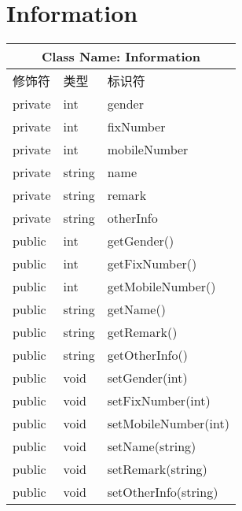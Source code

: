 \section{Information}
	\begin{tabular}{|l|l|l|}
	    \hline
	    \multicolumn{3}{|c|}{Class Name: Information} \\
	    \hline
	    修饰符 & 类型 & 标识符 \\
	    \hline
	    private & int & gender \\
	    private & int & fixNumber \\
	    private & int & mobileNumber \\
	    private & string & name \\
	    private & string & remark \\
	    private & string & otherInfo \\
	    \hline
	    public & int & getGender() \\
	    public & int & getFixNumber() \\
	    public & int & getMobileNumber() \\
	    public & string & getName() \\
	    public & string & getRemark() \\
	    public & string & getOtherInfo() \\
	    public & void & setGender(int) \\
	    public & void & setFixNumber(int) \\
	    public & void & setMobileNumber(int) \\
	    public & void & setName(string) \\
	    public & void & setRemark(string) \\
	    public & void & setOtherInfo(string) \\
	    \hline
	\end{tabular}